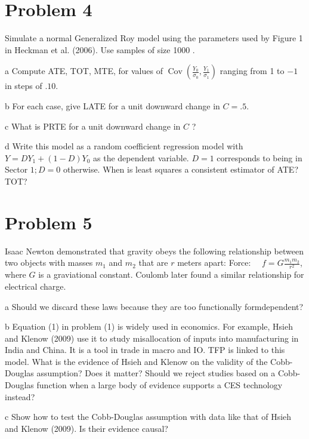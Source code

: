 \documentclass{article}
\begin{document}
\section*{Problem 4}
Simulate a normal Generalized Roy model using the parameters used by Figure 1 in Heckman et al. (2006). Use samples of size 1000 .
\begin{problem}{a}
Compute ATE, TOT, MTE, for values of $\operatorname{Cov}\left(\frac{Y_{0}}{\sigma_{0}}, \frac{Y_{1}}{\sigma_{1}}\right)$ ranging from 1 to $-1$ in steps of $.10$.
\end{problem}
\begin{problem}{b}
For each case, give LATE for a unit downward change in $C=.5$.
\end{problem}
\begin{problem}{c}
What is PRTE for a unit downward change in $C$ ?
\end{problem}
\begin{problem}{d}
Write this model as a random coefficient regression model with $Y=D Y_{1}+(1-D) Y_{0}$ as the dependent variable. $D=1$ corresponds to being in Sector $1 ; D=0$ otherwise. When is least squares a consistent estimator of ATE? TOT?
\end{problem}


\newpage
\section*{Problem 5}
Isaac Newton demonstrated that gravity obeys the following relationship between two objects with masses $m_{1}$ and $m_{2}$ that are $r$ meters apart:
Force: $\quad f=G \frac{m_{1} m_{2}}{r^{2}}$,
where $G$ is a graviational constant. Coulomb later found a similar relationship for electrical charge.
\begin{problem}{a}
Should we discard these laws because they are too functionally formdependent?
\end{problem}
\begin{problem}{b}
 Equation (1) in problem (1) is widely used in economics. For example, Hsieh and Klenow (2009) use it to study misallocation of inputs into manufacturing in India and China. It is a tool in trade in macro and IO. TFP is linked to this model. What is the evidence of Hsieh and Klenow on the validity of the Cobb-Douglas assumption? Does it matter? Should we reject studies based on a Cobb-Douglas function when a large body of evidence supports a CES technology instead?
\end{problem}
\begin{problem}{c}
Show how to test the Cobb-Douglas assumption with data like that
of Hsieh and Klenow (2009). Is their evidence causal?
\end{problem}
\end{document}
